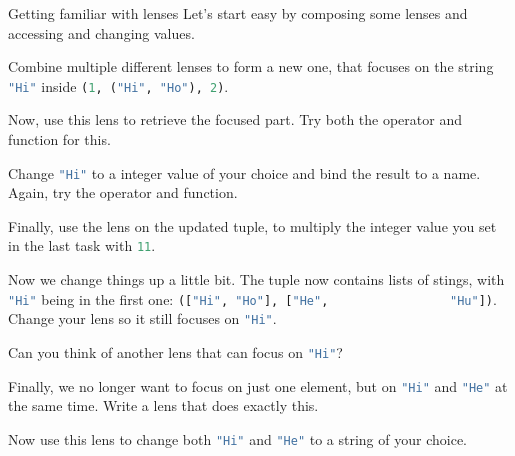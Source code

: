 \documentclass{exercise}
\newcommand\h[2][]{\lstinline[language=haskell,#1]{#2}}
\begin{document}
	\begin{exercise}{Getting familiar with lenses}
		Let's start easy by composing some lenses and accessing and changing values.
		\begin{tasks}
			\item Combine multiple different lenses to form a new one, that focuses on
				the string \h{"Hi"} inside \h{(1, ("Hi", "Ho"), 2)}.
			\item Now, use this lens to retrieve the focused part. Try both the operator
				and function for this.
			\item Change \h{"Hi"} to a integer value of your choice and bind the result
				to a name. Again, try the operator and function.
			\item Finally, use the lens on the updated tuple, to multiply the integer
				value you set in the last task with \h{11}.
			\item Now we change things up a little bit. The tuple now contains lists of
				stings, with \h{"Hi"} being in the first one: \h{(["Hi", "Ho"], ["He",
				"Hu"])}. Change your lens so it still focuses on \h{"Hi"}.
			\item Can you think of another lens that can focus on \h{"Hi"}?
			\item Finally, we no longer want to focus on just one element, but on
				\h{"Hi"} and \h{"He"} at the same time. Write a lens that does exactly
				this.
			\item Now use this lens to change both \h{"Hi"} and \h{"He"} to a string of
				your choice.
		\end{tasks}
	\end{exercise}
\end{document}
